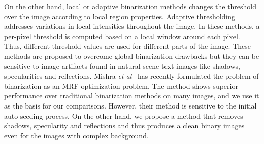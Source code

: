 On the other hand, local or adaptive binarization \cite{A8} methods changes the threshold over the image according to local region properties.
Adaptive thresholding addresses variations in local intensities throughout the image.
In these methods, a per-pixel threshold is computed based on a local window around each pixel. 
Thus, different threshold values are used for different parts of the image. 
These methods are proposed to overcome global binarization drawbacks but they can be sensitive
to image artifacts found in natural scene text images like shadows, specularities and reflections.
Mishra {\em et al}~\cite{A16} has recently formulated the problem of binarization as an MRF optimization problem. 
The method shows superior performance over traditional binarization methods on many images, and we use it as the
basis for our comparisons. However, their method is sensitive to the initial auto seeding process.
On the other hand, we propose a method that removes shadows, specularity and reflections and thus produces a clean 
binary images even for the images with complex background.
